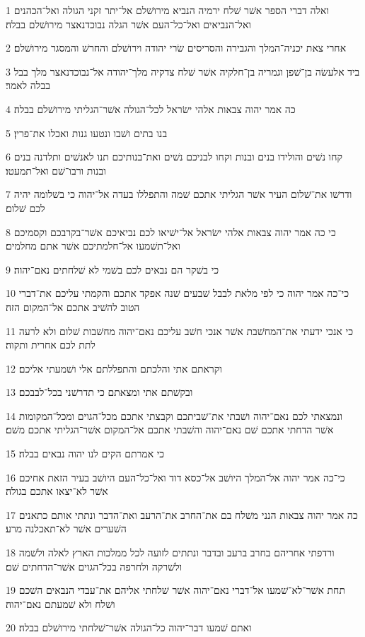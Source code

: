 \par 1 ואלה דברי הספר אשׁר שׁלח ירמיה הנביא מירושׁלם אל־יתר זקני הגולה ואל־הכהנים ואל־הנביאים ואל־כל־העם אשׁר הגלה נבוכדנאצר מירושׁלם בבלה׃
\par 2 אחרי צאת יכניה־המלך והגבירה והסריסים שׂרי יהודה וירושׁלם והחרשׁ והמסגר מירושׁלם׃
\par 3 ביד אלעשׂה בן־שׁפן וגמריה בן־חלקיה אשׁר שׁלח צדקיה מלך־יהודה אל־נבוכדנאצר מלך בבל בבלה לאמר׃
\par 4 כה אמר יהוה צבאות אלהי ישׂראל לכל־הגולה אשׁר־הגליתי מירושׁלם בבלה׃
\par 5 בנו בתים ושׁבו ונטעו גנות ואכלו את־פרין׃
\par 6 קחו נשׁים והולידו בנים ובנות וקחו לבניכם נשׁים ואת־בנותיכם תנו לאנשׁים ותלדנה בנים ובנות ורבו־שׁם ואל־תמעטו׃
\par 7 ודרשׁו את־שׁלום העיר אשׁר הגליתי אתכם שׁמה והתפללו בעדה אל־יהוה כי בשׁלומה יהיה לכם שׁלום׃
\par 8 כי כה אמר יהוה צבאות אלהי ישׂראל אל־ישׁיאו לכם נביאיכם אשׁר־בקרבכם וקסמיכם ואל־תשׁמעו אל־חלמתיכם אשׁר אתם מחלמים׃
\par 9 כי בשׁקר הם נבאים לכם בשׁמי לא שׁלחתים נאם־יהוה׃
\par 10 כי־כה אמר יהוה כי לפי מלאת לבבל שׁבעים שׁנה אפקד אתכם והקמתי עליכם את־דברי הטוב להשׁיב אתכם אל־המקום הזה׃
\par 11 כי אנכי ידעתי את־המחשׁבת אשׁר אנכי חשׁב עליכם נאם־יהוה מחשׁבות שׁלום ולא לרעה לתת לכם אחרית ותקוה׃
\par 12 וקראתם אתי והלכתם והתפללתם אלי ושׁמעתי אליכם׃
\par 13 ובקשׁתם אתי ומצאתם כי תדרשׁני בכל־לבבכם׃
\par 14 ונמצאתי לכם נאם־יהוה ושׁבתי את־שׁביתכם וקבצתי אתכם מכל־הגוים ומכל־המקומות אשׁר הדחתי אתכם שׁם נאם־יהוה והשׁבתי אתכם אל־המקום אשׁר־הגליתי אתכם משׁם׃
\par 15 כי אמרתם הקים לנו יהוה נבאים בבלה׃
\par 16 כי־כה אמר יהוה אל־המלך היושׁב אל־כסא דוד ואל־כל־העם היושׁב בעיר הזאת אחיכם אשׁר לא־יצאו אתכם בגולה׃
\par 17 כה אמר יהוה צבאות הנני משׁלח בם את־החרב את־הרעב ואת־הדבר ונתתי אותם כתאנים השׁערים אשׁר לא־תאכלנה מרע׃
\par 18 ורדפתי אחריהם בחרב ברעב ובדבר ונתתים לזועה לכל ממלכות הארץ לאלה ולשׁמה ולשׁרקה ולחרפה בכל־הגוים אשׁר־הדחתים שׁם׃
\par 19 תחת אשׁר־לא־שׁמעו אל־דברי נאם־יהוה אשׁר שׁלחתי אליהם את־עבדי הנבאים השׁכם ושׁלח ולא שׁמעתם נאם־יהוה׃
\par 20 ואתם שׁמעו דבר־יהוה כל־הגולה אשׁר־שׁלחתי מירושׁלם בבלה׃
